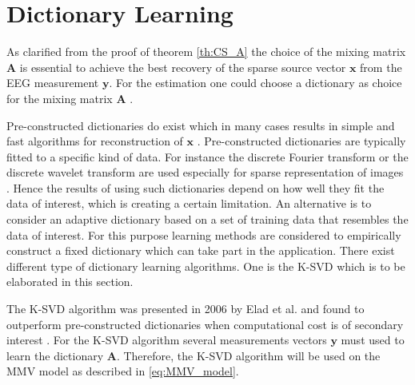 \section{Dictionary Learning}\label{sec:dictionarylearning}
As clarified from the proof of theorem \ref{th:CS_A} the choice of the mixing matrix $\mathbf{A}$ is essential to achieve the best recovery of the sparse source vector $\mathbf{x}$ from the EEG measurement $\mathbf{y}$. 
For the estimation one could choose a dictionary as choice for the mixing matrix $\mathbf{A}$ .

Pre-constructed dictionaries do exist which in many cases results in simple and fast algorithms for reconstruction of $\mathbf{x}$ \cite{Elad_book}. 
Pre-constructed dictionaries are typically fitted to a specific kind of data. 
For instance the discrete Fourier transform or the discrete wavelet transform are used especially for sparse representation of images \cite{Elad_book}. 
Hence the results of using such dictionaries depend on how well they fit the data of interest, which is creating a certain limitation. 
An alternative is to consider an adaptive dictionary based on a set of training data that resembles the data of interest. 
For this purpose learning methods are considered to empirically construct a fixed dictionary which can take part in the application. 
There exist different type of dictionary learning algorithms. One is the K-SVD which is to be elaborated in this section. 

The K-SVD algorithm was presented in 2006 by Elad et al. and found to outperform pre-constructed dictionaries when computational cost is of secondary interest \cite{Elad2006}. 
For the K-SVD algorithm several measurements vectors $\mathbf{y}$ must used to learn the dictionary $\mathbf{A}$. Therefore, the K-SVD algorithm will be used on the MMV model as described in \eqref{eq:MMV_model}.

